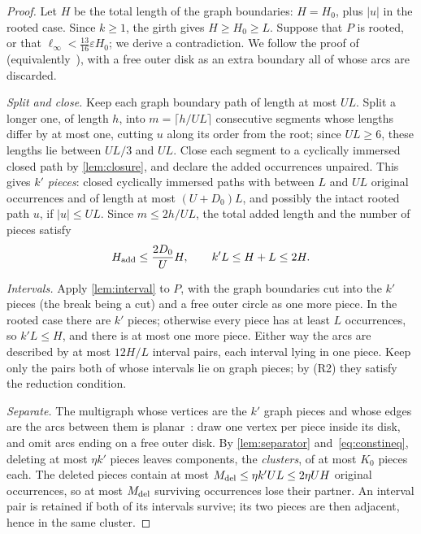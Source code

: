 \documentclass[11pt]{article}
\theoremstyle{definition}
\theoremstyle{plain}
\newcommand{\eps}{\varepsilon}
\begin{document}
\begin{proof}
Let $H$ be the total length of the graph boundaries: $H=H_0$, plus $|u|$ in the rooted case. Since $k\ge1$, the girth gives $H\ge H_0\ge L$. Suppose that $P$ is rooted, or that $\ell_\infty<\frac{13}{16}\eps H_0$; we derive a contradiction. We follow the proof of~\cite[Prop.~4.5]{OAI196} (equivalently~\cite[Thm.~5.2]{OAI197a}), with a free outer disk as an extra boundary all of whose arcs are discarded.

\emph{Split and close.} Keep each graph boundary path of length at most $UL$. Split a longer one, of length $h$, into $m=\lceil h/UL\rceil$ consecutive segments whose lengths differ by at most one, cutting $u$ along its order from the root; since $UL\ge6$, these lengths lie between $UL/3$ and $UL$. Close each segment to a cyclically immersed closed path by \cref{lem:closure}, and declare the added occurrences unpaired. This gives $k'$ \emph{pieces}: closed cyclically immersed paths with between $L$ and $UL$ original occurrences and of length at most $(U+D_0)L$, and possibly the intact rooted path $u$, if $|u|\le UL$. Since $m\le2h/UL$, the total added length and the number of pieces satisfy
\begin{equation}\label{eq:pieces}
H_{\rm add}\le\frac{2D_0}{U}H,\qquad k'L\le H+L\le 2H .
\end{equation}

\emph{Intervals.} Apply \cref{lem:interval} to $P$, with the graph boundaries cut into the $k'$ pieces (the break being a cut) and a free outer circle as one more piece. In the rooted case there are $k'$ pieces; otherwise every piece has at least $L$ occurrences, so $k'L\le H$, and there is at most one more piece. Either way the arcs are described by at most $12H/L$ interval pairs, each interval lying in one piece. Keep only the pairs both of whose intervals lie on graph pieces; by (R2) they satisfy the reduction condition.

\emph{Separate.} The multigraph whose vertices are the $k'$ graph pieces and whose edges are the arcs between them is planar~\cite[proof of Prop.~4.5]{OAI196}: draw one vertex per piece inside its disk, and omit arcs ending on a free outer disk. By \cref{lem:separator} and~\eqref{eq:constineq}, deleting at most $\eta k'$ pieces leaves components, the \emph{clusters}, of at most $K_0$ pieces each. The deleted pieces contain at most $M_{\rm del}\le\eta k'UL\le2\eta UH$ original occurrences, so at most $M_{\rm del}$ surviving occurrences lose their partner. An interval pair is retained if both of its intervals survive; its two pieces are then adjacent, hence in the same cluster.


\end{proof}
\end{document}
